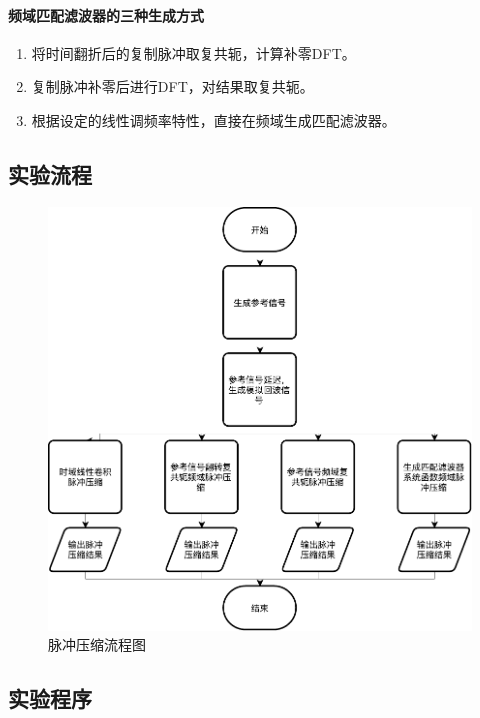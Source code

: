 \paragraph{频域匹配滤波器的三种生成方式}
\begin{enumerate}
	\item 将时间翻折后的复制脉冲取复共轭，计算补零DFT。
	\item 复制脉冲补零后进行DFT，对结果取复共轭。
	\item 根据设定的线性调频率特性，直接在频域生成匹配滤波器。
\end{enumerate}
\subsection{实验流程}
\begin{figure}[H]
	\centering
	\includegraphics[width=0.6\linewidth]{figure/PulseCompression1Flowchart.pdf}
	\caption{脉冲压缩流程图}
\end{figure}
\subsection{实验程序}

